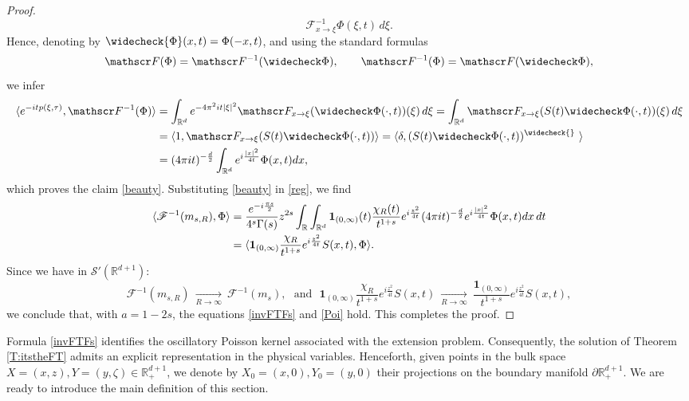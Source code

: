\documentclass[11pt,letter]{amsart}
\def \RNu {\mathbb{R}^{d+1}}
\def \RN {\mathbb{R}_+^{d+1}}
\def \R {\mathbb{R}}
\newcommand{\Rd}{\mathbb R^d}
\newcommand{\p}{\partial}
\numberwithin{equation}{section}
\newcommand{\sa}{\langle}
\newcommand{\da}{\rangle}
\numberwithin{equation}{section}
\begin{document}
\begin{proof}
\[\mathscr F^{-1}_{x\to\xi}\Phi(\xi,t)\,d\xi.
\]
Hence, denoting by $\widecheck{\Phi}(x,t) = \Phi(-x,t)$, and using the standard formulas
\[
\mathscr F(\Phi) = \mathscr F^{-1}(\widecheck \Phi),\ \ \ \ \ \ \mathscr F^{-1}(\Phi) = \mathscr F(\widecheck \Phi), 
\]
we infer
\begin{align*}
\langle e^{-i t p(\xi,\tau)},\mathscr F^{-1}(\Phi)\rangle & = \int_{\Rd} e^{-4\pi^2 i t |\xi|^2}
\mathscr F_{x\to\xi}(\widecheck \Phi(\cdot,t))(\xi)\,d\xi
 = \int_{\Rd} 
\mathscr F_{x\to\xi}(S(t)\widecheck \Phi(\cdot,t))(\xi)\,d\xi
\\
& = \sa 1,\mathscr F_{x\to\xi}(S(t)\widecheck \Phi(\cdot,t))\da = \sa \delta, (S(t)\widecheck \Phi(\cdot,t))^{\widecheck{}}\ \da
\\
& = (4\pi i t)^{-\frac d2} \int_{\Rd} e^{i\frac{|x|^2}{4t}} \Phi(x,t) dx,
\end{align*}
which proves the claim \eqref{beauty}. Substituting \eqref{beauty} in \eqref{reg}, we find
\begin{align}\label{reg2}
\langle \mathscr F^{-1}(m_{s,R}),\Phi\rangle
& =
\frac{e^{-i\frac{\pi s}2}}{4^s\Gamma(s)} z^{2s}
\int_\R \int_{\Rd}
\mathbf 1_{(0,\infty)}(t)\frac{\chi_R(t)}{
t^{1+s}}
e^{i \frac{z^2}{4t}}
(4\pi i t)^{-\frac d2}  e^{i\frac{|x|^2}{4t}} \Phi(x,t) dx
\,dt
\notag\\
& = \sa \mathbf 1_{(0,\infty)}\frac{\chi_R}{
t^{1+s}}
e^{i \frac{z^2}{4t}} S(x,t),\Phi \da.
\notag\end{align}
Since we have in $\mathscr S'(\RNu)$:
\[
\mathscr F^{-1}(m_{s,R})\ \underset{R\to \infty}{\longrightarrow}\ \mathscr F^{-1}(m_{s}),\ \ \ \text{and}\ \ \ \mathbf 1_{(0,\infty)}\frac{\chi_R}{
t^{1+s}}
e^{i \frac{z^2}{4t}} S(x,t)\ \underset{R\to \infty}{\longrightarrow}\ \frac{\mathbf 1_{(0,\infty)}}{
t^{1+s}}
e^{i \frac{z^2}{4t}} S(x,t),
\]
we conclude that, with $a=1-2s$, the equations \eqref{invFTFs} and \eqref{Poi} hold. This completes the proof.



\end{proof}

Formula \eqref{invFTFs} identifies the oscillatory Poisson kernel associated with the extension problem. Consequently, the solution of Theorem \ref{T:itstheFT} admits an explicit representation in the physical variables.
Henceforth, given points in the bulk space $X = (x,z), Y = (y,\zeta)\in \RN$, we denote by $X_0 = (x,0), Y_0 = (y,0)$ their projections on the boundary manifold $\p \RN$. We are ready to introduce the main definition of this section. 
\end{document}
